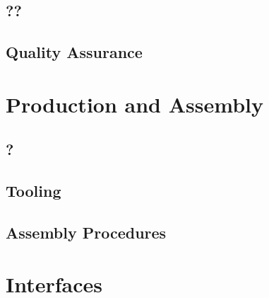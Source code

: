 
\subsection{??}
\label{sec:fddp-daq-??}

\subsection{Quality Assurance}
\label{sec:fddp-daq-qa}




\section{Production and Assembly}
\label{sec:fddp-daq-prod-assy}

\subsection{}
\label{sec:fddp-daq-?}

\subsection{?}
\label{sec:fddp-daq-??}


\subsection{Tooling}
\label{sec:fddp-daq-tooling}


\subsection{Assembly Procedures}
\label{sec:fddp-daq-assy}



\section{Interfaces}
\label{sec:fddp-daq-intfc}


